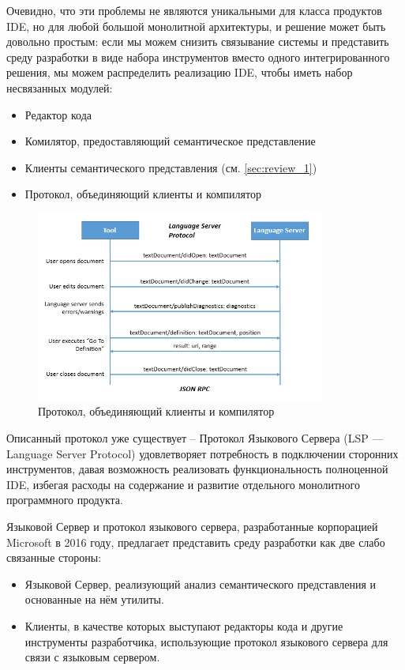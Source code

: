Очевидно, что эти проблемы не являются уникальными для класса продуктов IDE, но для любой большой монолитной архитектуры, 
и решение может быть довольно простым: если мы можем снизить связывание системы и представить среду разработки в виде набора инструментов 
вместо одного интегрированного решения, мы можем распределить реализацию IDE, чтобы иметь набор несвязанных модулей:
\begin{itemize}
    \item Редактор кода
    \item Комилятор, предоставляющий семантическое представление
    \item Клиенты семантического представления (см. \ref{sec:review_1})
    \item Протокол, объединяющий клиенты и компилятор
\end{itemize}
\newpage

\begin{figure}[H]
    \centering
    \includegraphics[width=0.85\textwidth]{figs/lsp.png}
    \caption{Протокол, объединяющий клиенты и компилятор}
\end{figure}

Описанный протокол уже существует -- Протокол Языкового Сервера (LSP --- Language Server Protocol) удовлетворяет потребность в подключении сторонних инструментов, давая возможность
реализовать функциональность полноценной IDE, избегая расходы на содержание и развитие отдельного монолитного программного продукта.

Языковой Сервер и протокол языкового сервера, разработанные корпорацией Microsoft в 2016 году, предлагает представить среду разработки как две слабо связанные стороны:
\begin{itemize}
    \item Языковой Сервер, реализующий анализ семантического представления и основанные на нём утилиты.
    \item Клиенты, в качестве которых выступают редакторы кода и другие инструменты разработчика, использующие протокол языкового сервера для связи с языковым сервером\cite{Sourcegraph}.
\end{itemize}


